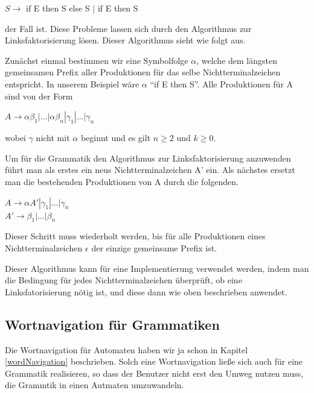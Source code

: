 \noindent
$S \to$ if E then S else S
$|$ if E then S
\vspace{10pt}

\noindent
der Fall ist. Diese Probleme lassen sich durch den Algorithmus zur
Linksfaktorisierung lösen. Dieser Algorithmus sieht wie folgt aus.\vspace{10pt}

Zunächst einmal bestimmen wir eine Symbolfolge $\alpha$, welche dem längsten
gemeinsamen Prefix aller Produktionen für das selbe Nichtterminalzeichen
 entspricht. In unserem Beispiel wäre $\alpha$ "`if E then
S"'. Alle Produktionen für A sind von der Form\vspace{10pt}

\noindent
$A \to \alpha \beta_1|\ldots|\alpha
\beta_n|\gamma_1|\ldots|\gamma_n$
\vspace{10pt}

\noindent
wobei $\gamma$ nicht mit $\alpha$ beginnt und es gilt $n \geq 2$ und $k \geq 0$.
\vspace{10pt}

Um für die Grammatik den Algorithmus zur Linksfaktorisierung anzuwenden führt
man als erstes ein neus Nichtterminalzeichen A' ein. Als
nächstes ersetzt man die bestehenden Produktionen von A
durch die folgenden.\vspace{10pt}

\noindent
$A \to \alpha A'|\gamma_1|\ldots|\gamma_n$\\
$A' \to \beta_1|\ldots|\beta_n$
\vspace{10pt}

\noindent
Dieser Schritt muss wiederholt werden, bis für alle Produktionen eines
Nichtterminalzeichen $\epsilon$ der einzige gemeinsame Prefix ist.\vspace{10pt} 

Dieser Algorithmus kann für eine Implementierung verwendet werden,
indem man die Bedingung für jedes Nichtterminalzeichen überprüft, ob eine Linksfatorisierung
nötig ist, und diese dann wie oben beschrieben anwendet.

\subsection{Wortnavigation für Grammatiken}

Die Wortnavigation für Automaten haben wir ja schon in Kapitel
\ref{wordNavigation} beschrieben. Solch eine Wortnavigation ließe sich auch
für eine Grammatik realisieren, so dass der Benutzer nicht erst den Umweg
nutzen muss, die Grammtik in einen Autmaten umzuwandeln.\vspace{10pt}

